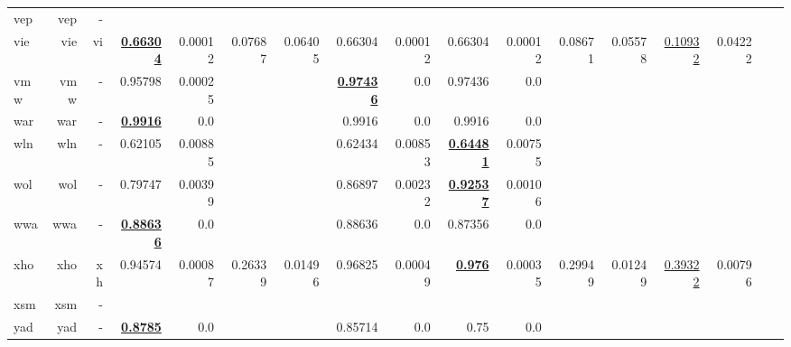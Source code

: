\documentclass[11pt]{article}
\begin{document}
\begin{table*}[h]
{\begin{tabular}{lrrrrrrrrrrrrrrrr}
vep         & vep         & -         &          &          &          &          &          &          &          &          &          &          &          &          \\
vie         & vie         & vi         & \textbf{\underline{0.66304}}         & 0.00012         & 0.07687         & 0.06405         & 0.66304         & 0.00012         & 0.66304         & 0.00012         & 0.08671         & 0.05578         & \underline{0.10932}         & 0.04222         \\
vmw         & vmw         & -         & 0.95798         & 0.00025         &          &          & \textbf{\underline{0.97436}}         & 0.0         & 0.97436         & 0.0         &          &          &          &          \\
war         & war         & -         & \textbf{\underline{0.9916}}         & 0.0         &          &          & 0.9916         & 0.0         & 0.9916         & 0.0         &          &          &          &          \\
wln         & wln         & -         & 0.62105         & 0.00885         &          &          & 0.62434         & 0.00853         & \textbf{\underline{0.64481}}         & 0.00755         &          &          &          &          \\
wol         & wol         & -         & 0.79747         & 0.00399         &          &          & 0.86897         & 0.00232         & \textbf{\underline{0.92537}}         & 0.00106         &          &          &          &          \\
wwa         & wwa         & -         & \textbf{\underline{0.88636}}         & 0.0         &          &          & 0.88636         & 0.0         & 0.87356         & 0.0         &          &          &          &          \\
xho         & xho         & xh         & 0.94574         & 0.00087         & 0.26339         & 0.01496         & 0.96825         & 0.00049         & \textbf{\underline{0.976}}         & 0.00035         & 0.29949         & 0.01249         & \underline{0.39322}         & 0.00796         \\
xsm         & xsm         & -         &          &          &          &          &          &          &          &          &          &          &          &          \\
yad         & yad         & -         & \textbf{\underline{0.8785}}         & 0.0         &          &          & 0.85714         & 0.0         & 0.75         & 0.0         &          &          &          &          \\

\end{tabular}}
\end{table*}
\end{document}
